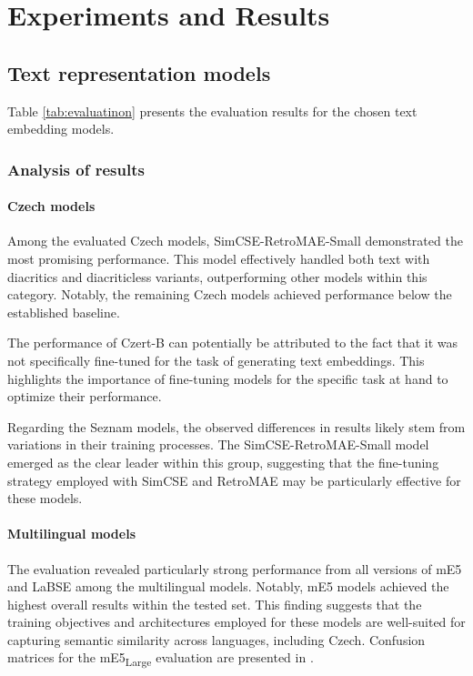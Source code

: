 
\chapter{Experiments and Results \label{chap:experiments_and_results}}

\section{Text representation models}
Table \ref{tab:evaluatinon} presents the evaluation results for the chosen text embedding models.

\subsection{Analysis of results}
\subsubsection{Czech models}
Among the evaluated Czech models, SimCSE-RetroMAE-Small demonstrated the most promising performance.
This model effectively handled both text with diacritics and diacriticless variants, outperforming other models within this category.
Notably, the remaining Czech models achieved performance below the established baseline.

The performance of Czert-B can potentially be attributed to the fact that it was not specifically fine-tuned for the task of generating text embeddings.
This highlights the importance of fine-tuning models for the specific task at hand to optimize their performance.

Regarding the Seznam models, the observed differences in results likely stem from variations in their training processes.
The SimCSE-RetroMAE-Small model emerged as the clear leader within this group, suggesting that the fine-tuning strategy employed with \ac{SimCSE} and \ac{RetroMAE} may be particularly effective for these models.

\subsubsection{Multilingual models}
The evaluation revealed particularly strong performance from all versions of \ac{mE5} and \ac{LaBSE} among the multilingual models.
Notably, \ac{mE5} models achieved the highest overall results within the tested set.
This finding suggests that the training objectives and architectures employed for these models are well-suited for capturing semantic similarity across languages, including Czech.
Confusion matrices for the \ac{mE5}\textsubscript{Large} evaluation are presented in .

